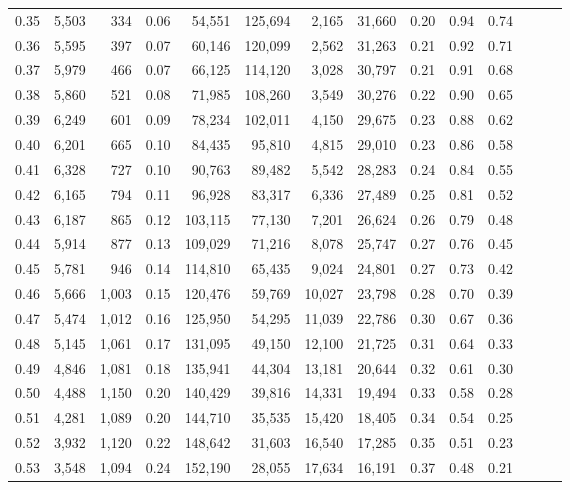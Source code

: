 \begin{tabular}{rrrrrrrrrrrrrr}
0.35 &  5,503 &    334 &  0.06 &   54,551 &  125,694 &   2,165 &  31,660 &  0.20 &  0.94 &      0.74 \\
0.36 &  5,595 &    397 &  0.07 &   60,146 &  120,099 &   2,562 &  31,263 &  0.21 &  0.92 &      0.71 \\
0.37 &  5,979 &    466 &  0.07 &   66,125 &  114,120 &   3,028 &  30,797 &  0.21 &  0.91 &      0.68 \\
0.38 &  5,860 &    521 &  0.08 &   71,985 &  108,260 &   3,549 &  30,276 &  0.22 &  0.90 &      0.65 \\
0.39 &  6,249 &    601 &  0.09 &   78,234 &  102,011 &   4,150 &  29,675 &  0.23 &  0.88 &      0.62 \\
0.40 &  6,201 &    665 &  0.10 &   84,435 &   95,810 &   4,815 &  29,010 &  0.23 &  0.86 &      0.58 \\
0.41 &  6,328 &    727 &  0.10 &   90,763 &   89,482 &   5,542 &  28,283 &  0.24 &  0.84 &      0.55 \\
0.42 &  6,165 &    794 &  0.11 &   96,928 &   83,317 &   6,336 &  27,489 &  0.25 &  0.81 &      0.52 \\
0.43 &  6,187 &    865 &  0.12 &  103,115 &   77,130 &   7,201 &  26,624 &  0.26 &  0.79 &      0.48 \\
0.44 &  5,914 &    877 &  0.13 &  109,029 &   71,216 &   8,078 &  25,747 &  0.27 &  0.76 &      0.45 \\
0.45 &  5,781 &    946 &  0.14 &  114,810 &   65,435 &   9,024 &  24,801 &  0.27 &  0.73 &      0.42 \\
0.46 &  5,666 &  1,003 &  0.15 &  120,476 &   59,769 &  10,027 &  23,798 &  0.28 &  0.70 &      0.39 \\
0.47 &  5,474 &  1,012 &  0.16 &  125,950 &   54,295 &  11,039 &  22,786 &  0.30 &  0.67 &      0.36 \\
0.48 &  5,145 &  1,061 &  0.17 &  131,095 &   49,150 &  12,100 &  21,725 &  0.31 &  0.64 &      0.33 \\
0.49 &  4,846 &  1,081 &  0.18 &  135,941 &   44,304 &  13,181 &  20,644 &  0.32 &  0.61 &      0.30 \\
0.50 &  4,488 &  1,150 &  0.20 &  140,429 &   39,816 &  14,331 &  19,494 &  0.33 &  0.58 &      0.28 \\
0.51 &  4,281 &  1,089 &  0.20 &  144,710 &   35,535 &  15,420 &  18,405 &  0.34 &  0.54 &      0.25 \\
0.52 &  3,932 &  1,120 &  0.22 &  148,642 &   31,603 &  16,540 &  17,285 &  0.35 &  0.51 &      0.23 \\
0.53 &  3,548 &  1,094 &  0.24 &  152,190 &   28,055 &  17,634 &  16,191 &  0.37 &  0.48 &      0.21 \\

\end{tabular}
